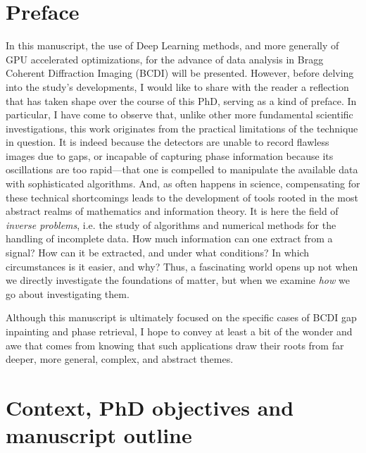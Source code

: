 \section{Preface}\label{chp:intro}

In this manuscript, the use of Deep Learning methods, and more generally of GPU accelerated optimizations, for the advance of 
data analysis in Bragg Coherent Diffraction Imaging (BCDI) will be presented. However, before delving into the 
study's developments, I would like to share with the reader a reflection that has taken shape over the course of this 
PhD, serving as a kind of preface. In particular, I have come to observe that, unlike other more fundamental 
scientific investigations, this work originates from the practical limitations of the technique in question. 
It is indeed because the detectors are unable to record flawless images due to gaps, or incapable of 
capturing phase information because its oscillations are too rapid—that one is compelled to manipulate the available 
data with sophisticated algorithms. And, as often happens in science, compensating for these technical shortcomings 
leads to the development of tools rooted in the most abstract realms of mathematics and information theory. It is here the 
field of \textit{inverse problems}, i.e. the study of algorithms and numerical methods for the handling of incomplete data. 
How much information can one extract from a signal? How can it be extracted, and under what conditions? In which 
circumstances is it easier, and why? Thus, a fascinating world opens up not when we directly investigate the foundations 
of matter, but when we examine \textit{how} we go about investigating them. 

Although this manuscript is ultimately focused on the specific cases of BCDI gap inpainting and phase retrieval, 
I hope to convey at least a bit of the wonder and awe that comes from knowing that such applications draw their roots 
from far deeper, more general, complex, and abstract themes.

\section{Context, PhD objectives and manuscript outline}

